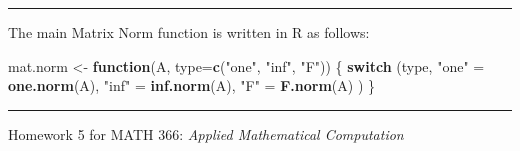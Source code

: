 \documentclass[
]{article}
\newenvironment{Shaded}{\begin{snugshade}}{\end{snugshade}}
\newcommand{\ControlFlowTok}[1]{\textcolor[rgb]{0.13,0.29,0.53}{\textbf{#1}}}
\newcommand{\DataTypeTok}[1]{\textcolor[rgb]{0.13,0.29,0.53}{#1}}
\newcommand{\KeywordTok}[1]{\textcolor[rgb]{0.13,0.29,0.53}{\textbf{#1}}}
\newcommand{\NormalTok}[1]{#1}
\newcommand{\StringTok}[1]{\textcolor[rgb]{0.31,0.60,0.02}{#1}}
\begin{document}
\begin{center}\rule{0.5\linewidth}{0.5pt}\end{center}

The main Matrix Norm function is written in R as follows:

\begin{Shaded}
\begin{Highlighting}[]
\NormalTok{mat.norm \textless{}{-}}\StringTok{ }\ControlFlowTok{function}\NormalTok{(A, }\DataTypeTok{type=}\KeywordTok{c}\NormalTok{(}\StringTok{"one"}\NormalTok{, }\StringTok{"inf"}\NormalTok{, }\StringTok{"F"}\NormalTok{)) \{}
  \ControlFlowTok{switch}\NormalTok{ (type,}
    \StringTok{"one"}\NormalTok{ =}\StringTok{ }\KeywordTok{one.norm}\NormalTok{(A),}
    \StringTok{"inf"}\NormalTok{ =}\StringTok{ }\KeywordTok{inf.norm}\NormalTok{(A),}
    \StringTok{"F"}\NormalTok{ =}\StringTok{ }\KeywordTok{F.norm}\NormalTok{(A)}
\NormalTok{  )}
\NormalTok{\}}
\end{Highlighting}
\end{Shaded}

\begin{center}\rule{0.5\linewidth}{0.5pt}\end{center}

Homework 5 for MATH 366: \emph{Applied Mathematical Computation}
\end{document}
